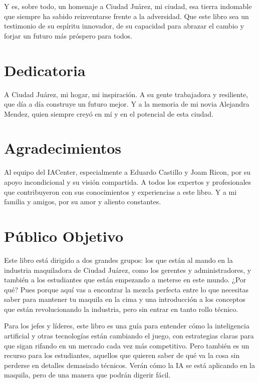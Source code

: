 \documentclass[
  10pt,
  letterpaper,
]{book}
\begin{document}
Y es, sobre todo, un homenaje a Ciudad Juárez, mi ciudad, esa tierra
indomable que siempre ha sabido reinventarse frente a la adversidad. Que
este libro sea un testimonio de su espíritu innovador, de su capacidad
para abrazar el cambio y forjar un futuro más próspero para todos.

\section*{Dedicatoria}\label{dedicatoria}


A Ciudad Juárez, mi hogar, mi inspiración. A su gente trabajadora y
resiliente, que día a día construye un futuro mejor. Y a la memoria de
mi novia Alejandra Mendez, quien siempre creyó en mí y en el potencial
de esta ciudad.

\section*{Agradecimientos}\label{agradecimientos}


Al equipo del IACenter, especialmente a Eduardo Castillo y Joam Ricon,
por su apoyo incondicional y su visión compartida. A todos los expertos
y profesionales que contribuyeron con sus conocimientos y experiencias a
este libro. Y a mi familia y amigos, por su amor y aliento constantes.

\section*{Público Objetivo}\label{puxfablico-objetivo}


Este libro está dirigido a dos grandes grupos: los que están al mando en
la industria maquiladora de Ciudad Juárez, como los gerentes y
administradores, y también a los estudiantes que están empezando a
meterse en este mundo. ¿Por qué? Pues porque aquí vas a encontrar la
mezcla perfecta entre lo que necesitas saber para mantener tu maquila en
la cima y una introducción a los conceptos que están revolucionando la
industria, pero sin entrar en tanto rollo técnico.

Para los jefes y líderes, este libro es una guía para entender cómo la
inteligencia artificial y otras tecnologías están cambiando el juego,
con estrategias claras para que sigan rifando en un mercado cada vez más
competitivo. Pero también es un recurso para los estudiantes, aquellos
que quieren saber de qué va la cosa sin perderse en detalles demasiado
técnicos. Verán cómo la IA se está aplicando en la maquila, pero de una
manera que podrán digerir fácil.
\end{document}
